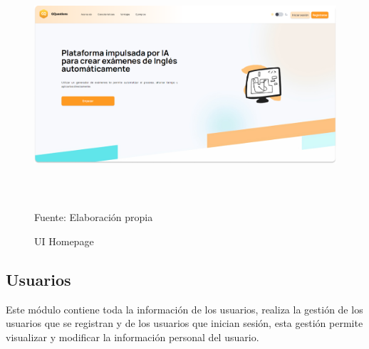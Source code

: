 \documentclass[../Main.tex]{subfiles}
\begin{document}
    \begin{figure}[H]
	\begin{Center}
		\includegraphics[width=6.4in,height=3.3in]{Images/ui_homepage.png}
	    \caption{UI Homepage}
	    Fuente: Elaboración propia
        \label{fig:section}
	\end{Center}
    \end{figure}
    
    \subsection{Usuarios}
    \begin{justify}
    Este módulo contiene toda la información de los usuarios, realiza la gestión de los usuarios que se registran y de los usuarios que inician sesión, esta gestión permite visualizar y modificar la información personal del usuario.  
    \end{justify}
    
    
\end{document}
